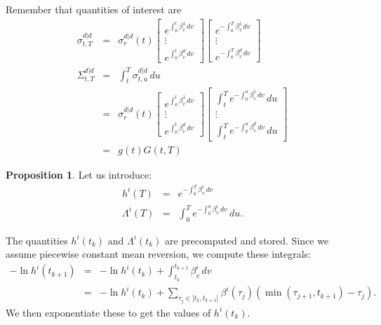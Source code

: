\documentclass[11pt,english]{amsart}
\theoremstyle{definition}
\newtheorem{prop}{Proposition}
\begin{document}
Remember that quantities of interest are 
\begin{eqnarray}
	\sigma^{d|d}_{t,T} 
	&=& \sigma^{d|d}_r(t) \begin{bmatrix} e^{\int_0^t  \beta^1_v \,dv } \\
	\vdots \\ 
	e^{\int_0^t  \beta^d_v \,dv } 
	\end{bmatrix} 
	\begin{bmatrix} e^{-\int_0^T  \beta^1_v \,dv } \\
	\vdots \\ 
	e^{-\int_0^T  \beta^d_v \,dv } 
	\end{bmatrix}  \\ 
	\Sigma^{d|d}_{t,T}  &=& \int_t^T \sigma^{d|d}_{t,u}\,du \\
	&=&   \sigma^{d|d}_r(t) \begin{bmatrix} e^{\int_0^t  \beta^1_v \,dv } \\
	\vdots \\ 
	e^{\int_0^t  \beta^d_v \,dv } 
	\end{bmatrix} 
	\begin{bmatrix} \int_t^T e^{-\int_0^u  \beta^1_v \,dv } \, du \\
	\vdots \\ 
	\int_t^T  e^{-\int_0^u  \beta^d_v \,dv } \, du
	\end{bmatrix}   \\
	&=& g(t)G(t,T)
\end{eqnarray}


\begin{prop}
Let us introduce:
\begin{eqnarray}
	h^i(T) &=& e^{-\int_0^T  \beta^i_v \,dv }  \\
	\Lambda^i(T) &=& \int_0^T e^{-\int_0^u  \beta^i_v \,dv } \, du .
\end{eqnarray}
\end{prop}

The quantities $h^i(t_k)$ and $\Lambda^i(t_k)$ are precomputed and stored. 
Since we assume piecewise constant mean reversion, we compute these integrals:
\begin{eqnarray}
	-\ln h^i(t_{k+1}) &=& -\ln h^i(t_{k}) + \int_{t_k}^{t_{k+1}} \beta^i_v\, dv  \\
	&=& -\ln h^i(t_{k}) +  \sum_{\tau_j\in [t_k,t_{k+1}[} \beta^i(\tau_j) (\min(\tau_{j+1},t_{k+1}) - \tau_j) .    
\end{eqnarray}
We then exponentiate these to get the values of $h^i(t_{k})$.
\end{document}
